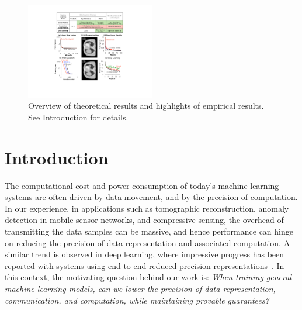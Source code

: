 \documentclass{article}
\begin{document}
\begin{figure}[t]
\centering
\includegraphics[width=0.5\textwidth]{Figures/RSHighlight}    
\vspace{-2em}
\caption{Overview of theoretical results and
highlights of empirical results. See
Introduction for details.}
\vspace{-1em}
\label{fig:highlight}
\end{figure}

\vspace{-3em}
\section{Introduction}

\vspace{-1em}
The computational cost and power consumption of today's machine learning systems are often driven by data movement, and by the precision of computation. 
In our experience, in applications such as tomographic reconstruction, anomaly detection in mobile sensor networks,
and compressive sensing, the overhead of transmitting the data samples can be massive, 
and hence performance can hinge on reducing the precision of data representation and 
associated computation. 
A similar trend is observed in deep learning, where impressive progress has been reported with systems 
using end-to-end reduced-precision representations~\cite{hubara2016quantized,
rastegari2016xnor,zhou2016dorefa,miyashita2016convolutional}. 
In this context, the motivating question behind our work is:  {\em When training general machine learning models,
can we lower the precision of data representation,
communication, and computation, while maintaining provable guarantees?}
 
% 
%
\end{document}
